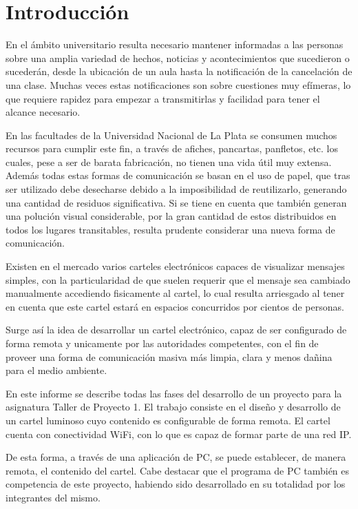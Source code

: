 \section{Introducción}
En el ámbito universitario resulta necesario mantener informadas a las personas sobre una amplia variedad de hechos, noticias y acontecimientos que sucedieron o sucederán, desde la ubicación de un aula hasta la notificación de la cancelación de una clase. Muchas veces estas notificaciones son sobre cuestiones muy efímeras, lo que requiere rapidez para empezar a transmitirlas y facilidad para tener el alcance necesario.

En las facultades de la Universidad Nacional de La Plata se consumen muchos recursos para cumplir este fin, a través de afiches, pancartas, panfletos, etc. los cuales, pese a ser de barata fabricación, no tienen una vida útil muy extensa. Además todas estas formas de comunicación se basan en el uso de papel, que tras ser utilizado debe desecharse debido a la imposibilidad de reutilizarlo, generando una cantidad de residuos significativa. Si se tiene en cuenta que también generan una polución visual considerable, por la gran cantidad de estos distribuidos en todos los lugares transitables, resulta prudente considerar una nueva forma de comunicación.

Existen en el mercado varios carteles electrónicos capaces de visualizar mensajes simples, con la particularidad de que suelen requerir que el mensaje sea cambiado manualmente accediendo fisicamente al cartel, lo cual resulta arriesgado al tener en cuenta que este cartel estará en espacios concurridos por cientos de personas.

Surge así la idea de desarrollar un cartel electrónico, capaz de ser configurado de forma remota y unicamente por las autoridades competentes, con el fin de proveer una forma de comunicación masiva más limpia, clara y menos dañina para el medio ambiente.

En este informe se describe todas las fases del desarrollo de un proyecto para la asignatura Taller de Proyecto 1. El trabajo consiste en el diseño y desarrollo de un cartel luminoso cuyo contenido es configurable de forma remota. El cartel cuenta con conectividad WiFi, con lo que es capaz de formar parte de una red IP.

De esta forma, a través de una aplicación de PC, se puede establecer, de manera remota, el contenido del cartel. Cabe destacar que el programa de PC también es competencia de este proyecto, habiendo sido desarrollado en su totalidad por los integrantes del mismo.

